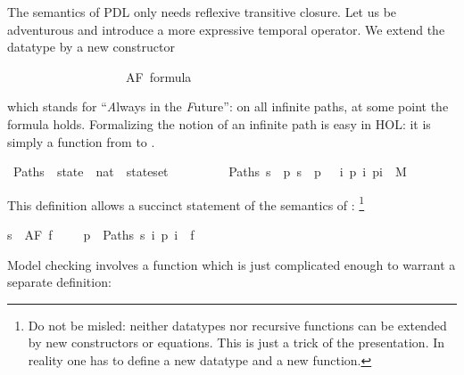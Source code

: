 %
\begin{isabellebody}%
\def\isabellecontext{CTL}%
\isamarkupfalse%
%
\isamarkuptrue%
%
\begin{isamarkuptext}%
\label{sec:CTL}
%
The semantics of PDL only needs reflexive transitive closure.
Let us be adventurous and introduce a more expressive temporal operator.
We extend the datatype
 by a new constructor%
\end{isamarkuptext}%
\isamarkuptrue%
\ \ \ \ \ \ \ \ \ \ \ \ \ \ \ \ \ \ {\isacharbar}\ AF\ formula\isamarkupfalse%
%
\begin{isamarkuptext}%
\noindent
which stands for ``\emph{A}lways in the \emph{F}uture'':
on all infinite paths, at some point the formula holds.
Formalizing the notion of an infinite path is easy
in HOL: it is simply a function from  to .%
\end{isamarkuptext}%
\isamarkuptrue%
\ Paths\ {\isacharcolon}{\isacharcolon}\ {\isachardoublequote}state\ {\isasymRightarrow}\ {\isacharparenleft}nat\ {\isasymRightarrow}\ state{\isacharparenright}set{\isachardoublequote}\isanewline
\ \ \ \ \ \ \ \ \ {\isachardoublequote}Paths\ s\ {\isasymequiv}\ {\isacharbraceleft}p{\isachardot}\ s\ {\isacharequal}\ p\ {}\ {\isasymand}\ {\isacharparenleft}{\isasymforall}i{\isachardot}\ {\isacharparenleft}p\ i{\isacharcomma}\ p{\isacharparenleft}i{\isacharplus}{}{\isacharparenright}{\isacharparenright}\ {\isasymin}\ M{\isacharparenright}{\isacharbraceright}{\isachardoublequote}\isamarkupfalse%
%
\begin{isamarkuptext}%
\noindent
This definition allows a succinct statement of the semantics of :
\footnote{Do not be misled: neither datatypes nor recursive functions can be
extended by new constructors or equations. This is just a trick of the
presentation. In reality one has to define a new datatype and a new function.}%
\end{isamarkuptext}%
\isamarkuptrue%
\isamarkupfalse%
{\isachardoublequote}s\ {\isasymTurnstile}\ AF\ f\ \ \ \ {\isacharequal}\ {\isacharparenleft}{\isasymforall}p\ {\isasymin}\ Paths\ s{\isachardot}\ {\isasymexists}i{\isachardot}\ p\ i\ {\isasymTurnstile}\ f{\isacharparenright}{\isachardoublequote}\isamarkupfalse%
%
\begin{isamarkuptext}%
\noindent
Model checking  involves a function which
is just complicated enough to warrant a separate definition:%
\end{isamarkuptext}%

\end{isabellebody}
